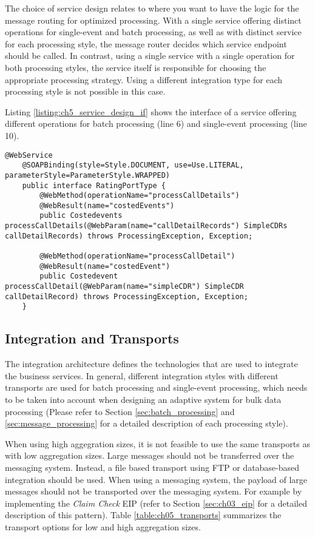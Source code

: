 The choice of service design relates to where you want to have the logic for the message routing for optimized processing. With a single service offering distinct operations for single-event and batch processing, as well as with distinct service for each processing style, the message router decides which service endpoint should be called. In contrast, using a single service with a single operation for both processing styles, the service itself is responsible for choosing the appropriate processing strategy. Using a different integration type for each processing style is not possible in this case.

Listing \ref{listing:ch5_service_design_if} shows the interface of a service offering different operations for batch processing (line 6) and single-event processing (line 10).

\begin{lstlisting}[caption={Java interface of a web  service offering different operations for single and batch processing.},label=listing:ch5_service_design_if]
	@WebService
	@SOAPBinding(style=Style.DOCUMENT, use=Use.LITERAL, parameterStyle=ParameterStyle.WRAPPED)
	public interface RatingPortType {
		@WebMethod(operationName="processCallDetails")
		@WebResult(name="costedEvents")
		public Costedevents processCallDetails(@WebParam(name="callDetailRecords") SimpleCDRs callDetailRecords) throws ProcessingException, Exception;
	
		@WebMethod(operationName="processCallDetail")
		@WebResult(name="costedEvent")
		public Costedevent processCallDetail(@WebParam(name="simpleCDR") SimpleCDR callDetailRecord) throws ProcessingException, Exception;
	}
\end{lstlisting}

\subsection{Integration and Transports}
\label{sec:ch05_transports}
The integration architecture defines the technologies that are used to integrate the business services. In general, different integration styles with different transports are used for batch processing and single-event processing, which needs to be taken into account when designing an adaptive system for bulk data processing (Please refer to Section \ref{sec:batch_processing} and \ref{sec:message_processing} for a detailed description of each processing style).

When using high aggegration sizes, it is not feasible to use the same transports as with low aggregation sizes. Large messages should not be transferred over the messaging system. Instead, a file based transport using \ac{FTP} or database-based integration should be used. When using a messaging system, the payload of large messages should not be transported over the messaging system. For example by implementing the \emph{Claim Check} \ac{EIP} (refer to Section \ref{sec:ch03_eip} for a detailed description of this pattern). Table \ref{table:ch05_transports} summarizes the transport options for low and high aggregation sizes.

